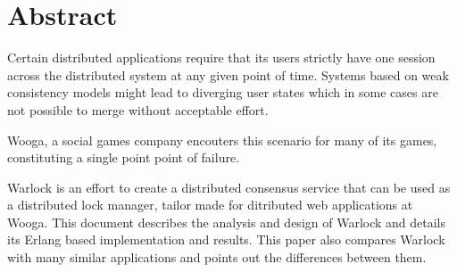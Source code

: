 \chapter{Abstract}

Certain distributed applications require that its users strictly have one
session across the distributed system at any given point of time. Systems
based on weak consistency models might lead to diverging user states which
in some cases are not possible to merge without acceptable effort.

Wooga, a social games company encouters this scenario for many of its
games, constituting a single point point of failure.

Warlock is an effort to create a distributed consensus service that can
be used as a distributed lock manager, tailor made for ditributed web
applications at Wooga. This document describes the analysis and design of
Warlock and details its Erlang based implementation and results. 
This paper also compares Warlock with many similar applications and points
out the differences between them.
